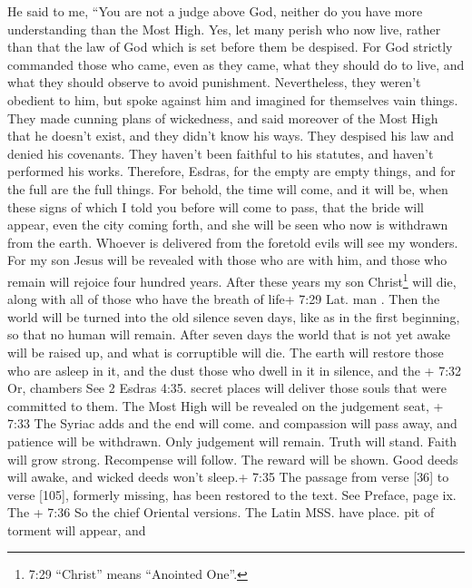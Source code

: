  He said to me, ``You are not a judge above God, neither do
you have more understanding than the Most High.  Yes, let
many perish who now live, rather than that the law of God which is set
before them be despised.  For God strictly commanded those
who came, even as they came, what they should do to live, and what they
should observe to avoid punishment.  Nevertheless, they
weren't obedient to him, but spoke against him and imagined for
themselves vain things.  They made cunning plans of
wickedness, and said moreover of the Most High that he doesn't exist,
and they didn't know his ways.  They despised his law and
denied his covenants. They haven't been faithful to his statutes, and
haven't performed his works.  Therefore, Esdras, for the
empty are empty things, and for the full are the full things.
 For behold, the time will come, and it will be, when these
signs of which I told you before will come to pass, that the bride will
appear, even the city coming forth, and she will be seen who now is
withdrawn from the earth.  Whoever is delivered from the
foretold evils will see my wonders.  For my son Jesus will
be revealed with those who are with him, and those who remain will
rejoice four hundred years.  After these years my son
Christ\footnote{7:29 ``Christ'' means ``Anointed One''.} will die, along
with all of those who have the breath of life+ 7:29 Lat. man .
 Then the world will be turned into the old silence seven
days, like as in the first beginning, so that no human will remain.
 After seven days the world that is not yet awake will be
raised up, and what is corruptible will die.  The earth
will restore those who are asleep in it, and the dust those who dwell in
it in silence, and the + 7:32 Or, chambers See 2 Esdras 4:35. secret
places will deliver those souls that were committed to them.
 The Most High will be revealed on the judgement seat, +
7:33 The Syriac adds and the end will come. and compassion will pass
away, and patience will be withdrawn.  Only judgement will
remain. Truth will stand. Faith will grow strong. 
Recompense will follow. The reward will be shown. Good deeds will awake,
and wicked deeds won't sleep.+ 7:35 The passage from verse {[}36{]} to
verse {[}105{]}, formerly missing, has been restored to the text. See
Preface, page ix.  The + 7:36 So the chief Oriental
versions. The Latin MSS. have place. pit of torment will appear, and
